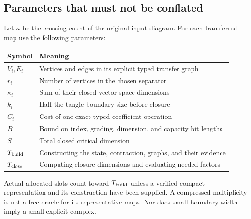 \documentclass[11pt,letterpaper]{article}
\theoremstyle{definition}\newtheorem{definition}[theorem]{Definition}
\theoremstyle{remark}\newtheorem{remark}[theorem]{Remark}
\begin{document}
\subsection{Parameters that must not be conflated}
Let $n$ be the crossing count of the original input diagram. For each
transferred map use the following parameters:
\begin{center}
\begin{tabular}{ll}
\toprule
Symbol & Meaning\\
\midrule
$V_i,E_i$ & Vertices and edges in its explicit typed transfer graph\\
$r_i$ & Number of vertices in the chosen separator\\
$\kappa_i$ & Sum of their closed vector-space dimensions\\
$k_i$ & Half the tangle boundary size before closure\\
$C_i$ & Cost of one exact typed coefficient operation\\
$B$ & Bound on index, grading, dimension, and capacity bit lengths\\
$S$ & Total closed critical dimension\\
$T_{\rm build}$ & Constructing the state, contraction, graphs, and their evidence\\
$T_{\rm close}$ & Computing closure dimensions and evaluating needed factors\\
\bottomrule
\end{tabular}
\end{center}
Actual allocated slots count toward $T_{\rm build}$ unless a verified compact
representation and its construction have been supplied. A compressed
multiplicity is not a free oracle for its representative maps. Nor does
small boundary width imply a small explicit complex.
\end{document}
